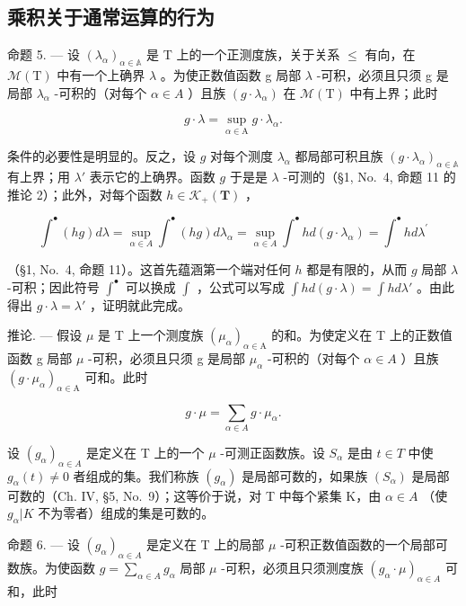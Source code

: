 \subsection{乘积关于通常运算的行为}

命题 5. --- 设 \((\lambda_{\alpha})_{\alpha\in\mathbb{A}}\) 是 T 上的一个正测度族，关于关系 \(\leqslant\) 有向，在 \(\mathcal{M}(\mathrm{T})\) 中有一个上确界 \(\lambda\) 。为使正数值函数 g 局部 \(\lambda\) -可积，必须且只须 g 是局部 \(\lambda_{\alpha}\) -可积的（对每个 \(\alpha\in A\) ）且族 \((g\cdot\lambda_{\alpha})\) 在 \(\mathcal{M}(\mathrm{T})\) 中有上界；此时

\[
g \cdot \lambda = \sup _ {\alpha \in \mathrm{A}} g \cdot \lambda_ {\alpha}.
\]

条件的必要性是明显的。反之，设 \(g\) 对每个测度 \(\lambda_{\alpha}\) 都局部可积且族 \((g \cdot \lambda_{\alpha})_{\alpha \in \mathbb{A}}\) 有上界；用 \(\lambda'\) 表示它的上确界。函数 \(g\) 于是是 \(\lambda\) -可测的（§1, No.~4, 命题 11 的推论 2）；此外，对每个函数 \(h \in \mathcal{K}_{+}(\mathbf{T})\) ，

\[
\int^ {\bullet} (h g) d \lambda = \sup _ {\alpha \in A} \int^ {\bullet} (h g) d \lambda_ {\alpha} = \sup _ {\alpha \in A} \int^ {\bullet} h d (g \cdot \lambda_ {\alpha}) = \int^ {\bullet} h d \lambda^ {\prime}
\]

（§1, No.~4, 命题 11）。这首先蕴涵第一个端对任何 \(h\) 都是有限的，从而 \(g\) 局部 \(\lambda\) -可积；因此符号 \(\int^{\bullet}\) 可以换成 \(\int\) ，公式可以写成 \(\int h d(g \cdot \lambda) = \int h d\lambda'\) 。由此得出 \(g \cdot \lambda = \lambda'\) ，证明就此完成。

推论. --- 假设 \(\mu\) 是 T 上一个测度族 \((\mu_{\alpha})_{\alpha\in\mathrm{A}}\) 的和。为使定义在 T 上的正数值函数 g 局部 \(\mu\) -可积，必须且只须 g 是局部 \(\mu_{\alpha}\) -可积的（对每个 \(\alpha\in A\) ）且族 \((g\cdot\mu_{\alpha})_{\alpha\in\mathrm{A}}\) 可和。此时

\[
g \cdot \mu = \sum_ {\alpha \in A} g \cdot \mu_ {\alpha}.\tag{7}
\]

设 \((g_{\alpha})_{\alpha \in A}\) 是定义在 T 上的一个 \(\mu\) -可测正函数族。设 \(S_{\alpha}\) 是由 \(t \in T\) 中使 \(g_{\alpha}(t) \neq 0\) 者组成的集。我们称族 \((g_{\alpha})\) 是局部可数的，如果族 \((S_{\alpha})\) 是局部可数的（Ch. IV, §5, No.~9）；这等价于说，对 T 中每个紧集 K，由 \(\alpha \in A\) （使 \(g_{\alpha}|K\) 不为零者）组成的集是可数的。

命题 6. --- 设 \((g_{\alpha})_{\alpha \in A}\) 是定义在 T 上的局部 \(\mu\) -可积正数值函数的一个局部可数族。为使函数 \(g = \sum_{\alpha \in A} g_{\alpha}\) 局部 \(\mu\) -可积，必须且只须测度族 \((g_{\alpha} \cdot \mu)_{\alpha \in A}\) 可和，此时

